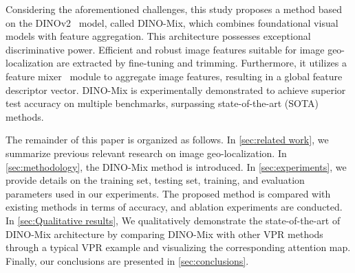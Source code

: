 % 
Considering the aforementioned challenges, this study proposes a method based on the DINOv2~\cite{oquab_dinov2_2023} model, called DINO-Mix, which combines foundational visual models with feature aggregation. This architecture possesses exceptional discriminative power. Efficient and robust image features suitable for image geo-localization are extracted by fine-tuning and trimming. Furthermore, it utilizes a feature mixer~\cite{tolstikhin_mlp-mixer_2021} module to aggregate image features, resulting in a global feature descriptor vector. DINO-Mix is experimentally demonstrated to achieve superior test accuracy on multiple benchmarks, surpassing state-of-the-art (SOTA) methods.

% 
The remainder of this paper is organized as follows. In  \ref{sec:related work}, we summarize previous relevant research on image geo-localization. In \ref{sec:methodology}, the DINO-Mix method is introduced. In \ref{sec:experiments}, we provide details on the training set, testing set, training, and evaluation parameters used in our experiments. The proposed method is compared with existing methods in terms of accuracy, and ablation experiments are conducted. In \ref{sec:Qualitative results}, We qualitatively demonstrate the state-of-the-art of DINO-Mix architecture by comparing DINO-Mix with other VPR methods through a typical VPR example and visualizing the corresponding attention map. Finally, our conclusions are presented in \ref{sec:conclusions}.
